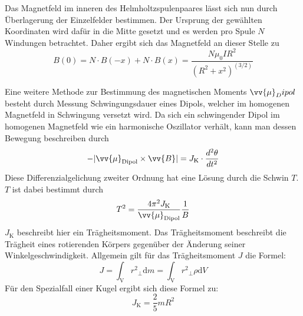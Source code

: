 Das Magnetfeld im inneren des Helmholtzspulenpaares lässt sich nun durch Überlagerung der Einzelfelder bestimmen. Der Ursprung der gewählten Koordinaten wird dafür in die Mitte 
gesetzt und es werden pro Spule $N$ Windungen betrachtet. Daher ergibt sich das Magnetfeld an dieser Stelle zu
\begin{equation}
    \label{eqn:Helmholtz_B}
    B(0) = N\cdot B(-x) +N\cdot B(x) = \frac{N\mu_0 IR^2}{\left(R^2 + x^2 \right)^{(3/2)}}
\end{equation}


Eine weitere Methode zur Bestimmung des magnetischen Moments $\vv{\mu}_Dipol$ besteht durch Messung Schwingungsdauer eines Dipols, welcher im homogenen Magnetfeld
in Schwingung versetzt wird. Da sich ein schwingender Dipol im homogenen Magnetfeld wie ein harmonische Oszillator verhält, kann man dessen Bewegung beschreiben durch
\begin{equation}
    \label{eqn:BewegungsgleichungKugel}
    -\lvert \vv{\mu}_{\text{Dipol}} \times \vv{B}\rvert = J_{\text{K}} \cdot \frac{d^2 \theta}{dt^2}
\end{equation}
Diese Differenzialgelichung zweiter Ordnung hat eine Lösung durch die Schwin $T$. $T$ ist dabei bestimmt durch
\begin{equation}
    \label{eqn:Schwingungsdauer}
    T^2 = \frac{4{\pi}^2 J_{\text{K}}}{\vv{\mu}_{\text{Dipol}}}\frac{1}{B}
\end{equation} 
$J_{\text{K}}$ beschreibt hier ein Trägheitsmoment. Das Trägheitsmoment beschreibt die Trägheit eines rotierenden Körpers gegenüber der Änderung seiner Winkelgeschwindigkeit.
Allgemein gilt für das Trägheitsmoment $J$ die Formel:
\begin{equation}
    \label{eqn:Trägheitsmoment}
    J = \int_{\text{V}} {r^2}_{\bot} \text{d}m = \int_{\text{V}} {r^2}_{\bot} \rho \text{d}V
\end{equation} 
\cite{Demtröder_Exp_P_1}
Für den Spezialfall einer Kugel ergibt sich diese Formel zu:
\begin{equation}
    \label{eqn:Trägheitsmoment_Kugel}
    J_{\text{K}} = \frac{2}{5} m R^2
\end{equation}


